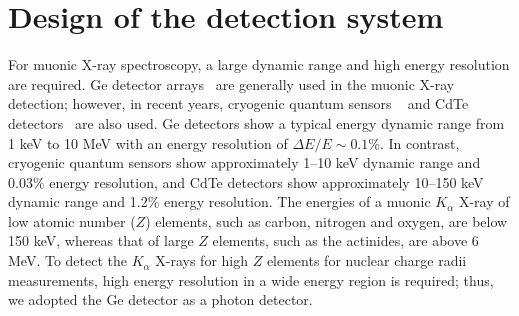 \section{Design of the detection system} \label{sec:Methods_1}

For muonic X-ray spectroscopy, a large dynamic range and high energy resolution are required.
Ge detector arrays~\cite{Gerchow2023-pp, Tampo2023-qf, Hillier2016-xa} are generally used in the muonic X-ray detection; however, in recent years, cryogenic quantum sensors ~\cite{Ullom2015-yb} and CdTe detectors~\cite{Chiu2022-me} are also used. %
Ge detectors show a typical energy dynamic range from 1 keV to 10 MeV with an energy resolution of $\Delta E/E\sim0.1\%$. In contrast, cryogenic quantum sensors show approximately 1--10 keV dynamic range and 0.03\% energy resolution, and CdTe detectors show approximately 10--150 keV dynamic range and 1.2\% energy resolution.
The energies of a muonic $K_\alpha$ X-ray of low atomic number ($Z$) elements, such as carbon, nitrogen and oxygen, are below 150 keV, whereas that of large $Z$ elements, such as the actinides, are above 6 MeV. %
To detect the $K_\alpha$ X-rays for high $Z$ elements for nuclear charge radii measurements, high energy resolution in a wide energy region is required; thus, we adopted the Ge detector as a photon detector.

